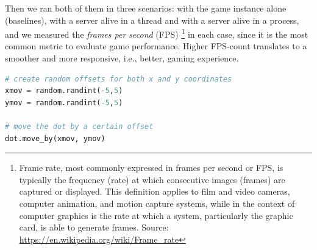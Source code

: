 Then we ran both of them in three scenarios: with the game instance alone (baselines), with a server alive in a thread and with a server alive in a process, and we measured the \textit{frames per second} (FPS) \footnote{Frame rate, most commonly expressed in frames per second or FPS, is typically the frequency (rate) at which consecutive images (frames) are captured or displayed. This definition applies to film and video cameras, computer animation, and motion capture systems, while in the context of computer graphics is the rate at which a system, particularly the graphic card, is able to generate frames. Source: \url{https://en.wikipedia.org/wiki/Frame_rate}} in each case, since it is the most common metric to evaluate game performance. Higher FPS-count translates to a smoother and more responsive, i.e., better, gaming experience.

\begin{lstlisting}[language={Python},label={code:randomdots}, caption={Pygame graphical dot offset}]
# create random offsets for both x and y coordinates
xmov = random.randint(-5,5)
ymov = random.randint(-5,5)

# move the dot by a certain offset
dot.move_by(xmov, ymov)
\end{lstlisting}


